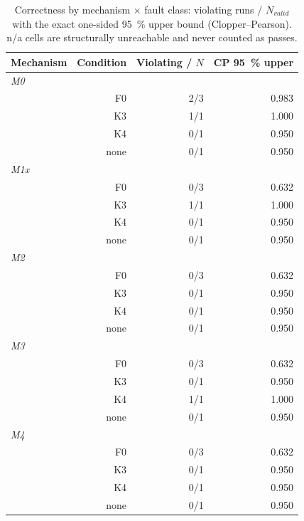 
\begin{table}[htbp]
\centering
\small
\caption{Correctness by mechanism × fault class: violating runs / $N_{valid}$ with the exact one-sided 95~\% upper bound (Clopper–Pearson). n/a cells are structurally unreachable and never counted as passes.}
\label{tab:correctness}
\begin{tabular}{lrrr}
\toprule
\textbf{Mechanism} & \textbf{Condition} & \textbf{Violating / $N$} & \textbf{CP 95~\% upper} \\
\midrule
\multicolumn{4}{l}{\textit{M0}} \\
 & F0 & 2/3 & 0.983 \\
 & K3 & 1/1 & 1.000 \\
 & K4 & 0/1 & 0.950 \\
 & none & 0/1 & 0.950 \\
\multicolumn{4}{l}{\textit{M1x}} \\
 & F0 & 0/3 & 0.632 \\
 & K3 & 1/1 & 1.000 \\
 & K4 & 0/1 & 0.950 \\
 & none & 0/1 & 0.950 \\
\multicolumn{4}{l}{\textit{M2}} \\
 & F0 & 0/3 & 0.632 \\
 & K3 & 0/1 & 0.950 \\
 & K4 & 0/1 & 0.950 \\
 & none & 0/1 & 0.950 \\
\multicolumn{4}{l}{\textit{M3}} \\
 & F0 & 0/3 & 0.632 \\
 & K3 & 0/1 & 0.950 \\
 & K4 & 1/1 & 1.000 \\
 & none & 0/1 & 0.950 \\
\multicolumn{4}{l}{\textit{M4}} \\
 & F0 & 0/3 & 0.632 \\
 & K3 & 0/1 & 0.950 \\
 & K4 & 0/1 & 0.950 \\
 & none & 0/1 & 0.950 \\
\bottomrule
\end{tabular}
\end{table}
